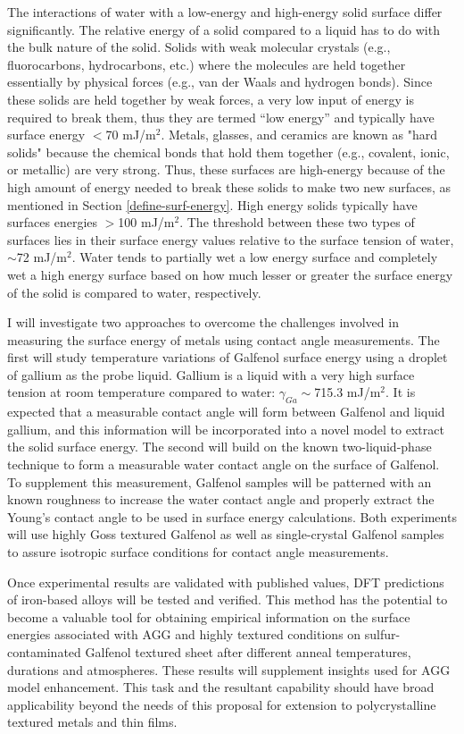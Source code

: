 
The interactions of water with a low-energy and high-energy solid surface differ significantly. The relative energy of a solid compared to a liquid has to do with the bulk nature of the solid. Solids with weak molecular crystals (e.g., fluorocarbons, hydrocarbons, etc.) where the molecules are held together essentially by physical forces (e.g., van der Waals and hydrogen bonds). Since these solids are held together by weak forces, a very low input of energy is required to break them, thus they are termed “low energy” and typically have surface energy $<$70 mJ/m$^2$.  Metals, glasses, and ceramics are known as "hard solids" because the chemical bonds that hold them together (e.g., covalent, ionic, or metallic) are very strong. Thus, these surfaces are high-energy because of the high amount of energy needed to break these solids to make two new surfaces, as mentioned in Section \ref{define-surf-energy}. High energy solids typically have surfaces energies $>$100 mJ/m$^2$.  The threshold between these two types of surfaces lies in their surface energy values relative to the surface tension of water, $\sim$72 mJ/m$^2$. Water tends to partially wet a low energy surface and completely wet a high energy surface based on how much lesser or greater the surface energy of the solid is compared to water, respectively. 

I will investigate two approaches to overcome the challenges involved in measuring the surface energy of metals using contact angle measurements. The first will study temperature variations of Galfenol surface energy using a droplet of gallium as the probe liquid. Gallium is a liquid with a very high surface tension at room temperature compared to water: $\gamma_{Ga}\sim$715.3 mJ/m$^2$. It is expected that a measurable contact angle will form between Galfenol and liquid gallium, and this information will be incorporated into a novel model to extract the solid surface energy. The second will build on the known two-liquid-phase technique to form a measurable water contact angle on the surface of Galfenol. To supplement this measurement, Galfenol samples will be patterned with an known roughness to increase the water contact angle and properly extract the Young's contact angle to be used in surface energy calculations. Both experiments will use highly Goss textured Galfenol as well as single-crystal Galfenol samples to assure isotropic surface conditions for contact angle measurements. 

Once experimental results are validated with published values, DFT predictions of iron-based alloys will be tested and verified. This method has the potential to become a valuable tool for obtaining empirical information on the surface energies associated with AGG and highly textured conditions on sulfur-contaminated Galfenol textured sheet after different anneal temperatures, durations and atmospheres. These results will supplement insights used for AGG model enhancement. This task and the resultant capability should have broad applicability beyond the needs of this proposal for extension to polycrystalline textured metals and thin films.


